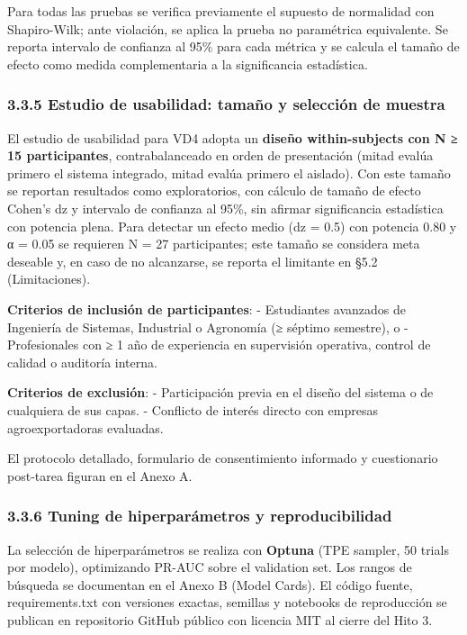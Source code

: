 Para todas las pruebas se verifica previamente el supuesto de normalidad
con Shapiro-Wilk; ante violación, se aplica la prueba no paramétrica
equivalente. Se reporta intervalo de confianza al 95\% para cada métrica
y se calcula el tamaño de efecto como medida complementaria a la
significancia estadística.

\subsubsection{3.3.5 Estudio de usabilidad: tamaño y selección de
muestra}\label{estudio-de-usabilidad-tamauxf1o-y-selecciuxf3n-de-muestra}

El estudio de usabilidad para VD4 adopta un \textbf{diseño
within-subjects con N ≥ 15 participantes}, contrabalanceado en orden de
presentación (mitad evalúa primero el sistema integrado, mitad evalúa
primero el aislado). Con este tamaño se reportan resultados como
exploratorios, con cálculo de tamaño de efecto Cohen's dz y intervalo de
confianza al 95\%, sin afirmar significancia estadística con potencia
plena. Para detectar un efecto medio (dz = 0.5) con potencia 0.80 y α =
0.05 se requieren N = 27 participantes; este tamaño se considera meta
deseable y, en caso de no alcanzarse, se reporta el limitante en §5.2
(Limitaciones).

\textbf{Criterios de inclusión de participantes}: - Estudiantes
avanzados de Ingeniería de Sistemas, Industrial o Agronomía (≥ séptimo
semestre), o - Profesionales con ≥ 1 año de experiencia en supervisión
operativa, control de calidad o auditoría interna.

\textbf{Criterios de exclusión}: - Participación previa en el diseño del
sistema o de cualquiera de sus capas. - Conflicto de interés directo con
empresas agroexportadoras evaluadas.

El protocolo detallado, formulario de consentimiento informado y
cuestionario post-tarea figuran en el Anexo A.

\subsubsection{3.3.6 Tuning de hiperparámetros y
reproducibilidad}\label{tuning-de-hiperparuxe1metros-y-reproducibilidad}

La selección de hiperparámetros se realiza con \textbf{Optuna} (TPE
sampler, 50 trials por modelo), optimizando PR-AUC sobre el validation
set. Los rangos de búsqueda se documentan en el Anexo B (Model Cards).
El código fuente, requirements.txt con versiones exactas, semillas y
notebooks de reproducción se publican en repositorio GitHub público con
licencia MIT al cierre del Hito 3.

